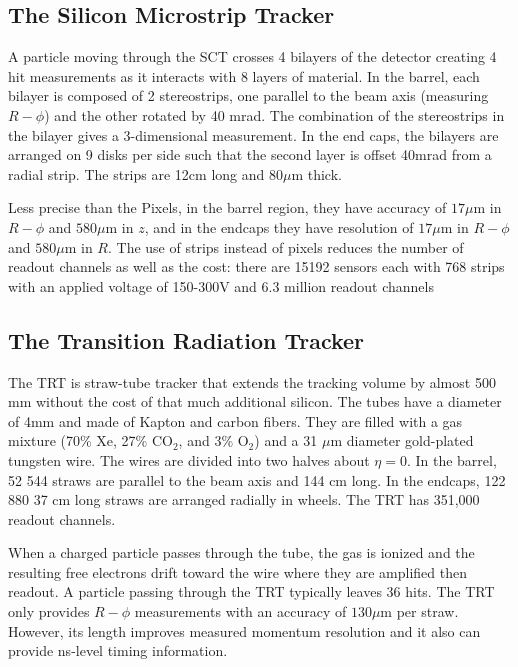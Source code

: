 \subsection{The Silicon Microstrip Tracker}
A particle moving through the \ac{SCT} crosses 4 bilayers of the detector creating 4 hit measurements as it interacts with 8 layers of material. In the barrel, each bilayer is composed of 2 stereostrips, one parallel to the beam axis (measuring $R-\phi$) and the other rotated by 40 mrad. The combination of the stereostrips in the bilayer gives a 3-dimensional measurement. In the end caps, the bilayers are arranged on 9  disks per side such that the second layer is offset 40mrad from a radial strip. The strips are 12cm long and $80 \mu\textrm{m}$ thick.

Less precise than the Pixels, in the barrel region, they have accuracy of $17 \mu \textrm{m}$ in $R-\phi$ and $580 \mu \textrm{m}$ in $z$, and in the endcaps they have resolution of $17 \mu \textrm{m}$ in $R-\phi$ and $580 \mu \textrm{m}$ in $R$. The use of strips instead of pixels reduces the number of readout channels as well as the cost: there are 15192 sensors each with 768 strips with an applied voltage of 150-300V and 6.3 million readout channels 
 

\subsection{The Transition Radiation Tracker}
The \ac{TRT} is straw-tube tracker that extends the tracking volume by almost 500 mm without the cost of that much additional silicon. The tubes have a diameter of 4mm and made of Kapton and carbon fibers. They are filled with a gas mixture (70\% Xe, 27\% CO$_{2}$, and 3\% O$_{2}$) and a 31 $\mu$m diameter gold-plated tungsten wire. The wires are divided into two halves about $\eta = 0$. In the barrel, 52 544 straws are parallel to the beam axis and 144 cm long. In the endcaps, 122 880 37 cm long straws are arranged radially in wheels. The \ac{TRT} has 351,000 readout channels.

When a charged particle passes through the tube, the gas is ionized and the resulting free electrons drift toward the wire where they are amplified then readout. A particle passing through the \ac{TRT} typically leaves 36 hits. The \ac{TRT} only provides $R-\phi$ measurements with an accuracy of $130 \mu\textrm{m}$ per straw. However, its length improves measured momentum resolution and it also can provide ns-level timing information.


